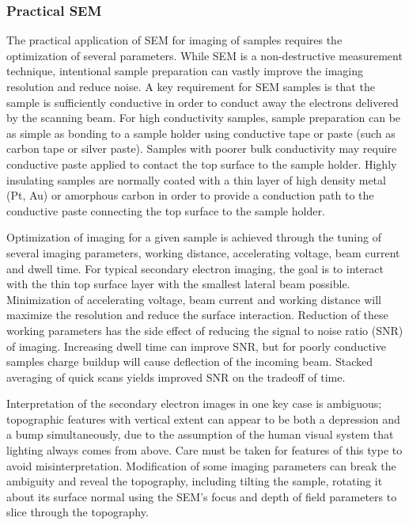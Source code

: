 \subsubsection{Practical SEM} The practical application of SEM for imaging of samples requires the optimization of several parameters.
While SEM is a non-destructive measurement technique, intentional sample preparation can vastly improve the imaging resolution and reduce noise.
A key requirement for SEM samples is that the sample is sufficiently conductive in order to conduct away the electrons delivered by the scanning beam.
For high conductivity samples, sample preparation can be as simple as bonding to a sample holder using conductive tape or paste (such as carbon tape or silver paste).
Samples with poorer bulk conductivity may require conductive paste applied to contact the top surface to the sample holder.
Highly insulating samples are normally coated with a thin layer of high density metal (Pt, Au) or amorphous carbon in order to provide a conduction path to the conductive paste connecting the top surface to the sample holder.

Optimization of imaging for a given sample is achieved through the tuning of several imaging parameters, working distance, accelerating voltage, beam current and dwell time\cite{goldstein2003scanning}.
For typical secondary electron imaging, the goal is to interact with the thin top surface layer with the smallest lateral beam possible.
Minimization of accelerating voltage, beam current and working distance will maximize the resolution and reduce the surface interaction.
Reduction of these working parameters has the side effect of reducing the signal to noise ratio (SNR) of imaging.
Increasing dwell time can improve SNR, but for poorly conductive samples charge buildup will cause deflection of the incoming beam.
Stacked averaging of quick scans yields improved SNR on the tradeoff of time.

Interpretation of the secondary electron images in one key case is ambiguous; topographic features with vertical extent can appear to be both a depression and a bump simultaneously, due to the assumption of the human visual system that lighting always comes from above\cite{goldstein2003scanning}.
Care must be taken for features of this type to avoid misinterpretation.
Modification of some imaging parameters can break the ambiguity and reveal the topography, including tilting the sample, rotating it about its surface normal using the SEM's focus and depth of field parameters to slice through the topography.


